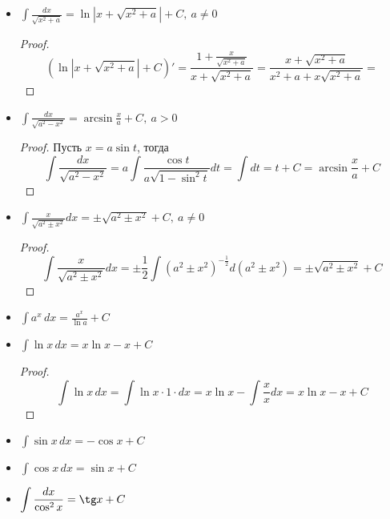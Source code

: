 \begin{itemize}
	\item $\displaystyle \int \frac{dx}{\sqrt{x^2 + a}} = \ln \left| x + \sqrt{x^2 + a} \right| + C, \ a \neq 0$
	\begin{proof}
	\begin{equation*}
	(\ln \left| x + \sqrt{x^2 + a} \right| + C)' =
	\frac{1 + \frac{x}{\sqrt{x^2 + a}}}
	{x + \sqrt{x^2 + a}} =
	\frac{x + \sqrt{x^2 + a}}
	{x^2 + a + x \sqrt{x^2 + a}} =
	\end{equation*}
	\end{proof}
	
	\item $\displaystyle \int \frac{dx}{\sqrt{a^2 - x^2}} = \arcsin \frac{x}a + C, \ a > 0$
	\begin{proof}
	Пусть $x = a \sin t$, тогда
	\begin{equation*}
	\int \frac{dx}{\sqrt{a^2 - x^2}} =
	a \int \frac{\cos t}{a \sqrt{1 - \sin^2 t}} dt =
	\int dt =
	t + C =
	\arcsin \frac{x}a + C
	\end{equation*}
	\end{proof}
	
	\item $\displaystyle \int \frac{x}{\sqrt{a^2 \pm x^2}} dx = \pm \sqrt{a^2 \pm x^2} + C, \ a \neq 0$
	\begin{proof}
	\begin{equation*}
	\int \frac{x}{\sqrt{a^2 \pm x^2}} dx =
	\pm \frac12 \int (a^2 \pm x^2)^{-\tfrac12} d(a^2 \pm x^2) =
	\pm \sqrt{a^2 \pm x^2} + C
	\end{equation*}
	\end{proof}
	
	\item $\displaystyle \int a^x\,dx = \frac{a^x}{\ln a} + C$
	
	\item $\displaystyle \int \ln x\,dx = x \ln x - x + C$
	\begin{proof}
	\begin{equation*}
	\int \ln x\,dx =
	\int \ln x \cdot 1 \cdot dx =
	x \ln x - \int \frac{x}x dx =
	x \ln x - x + C
	\end{equation*}
	\end{proof}
	
	\item $\displaystyle \int \sin x\,dx = -\cos x + C$
	
	\item $\displaystyle \int \cos x\,dx = \sin x + C$
	
	\item $\displaystyle \int \frac{dx}{\cos^2 x} = \tg x + C$
	

\end{itemize}
